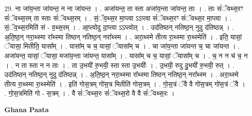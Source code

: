 \documentclass[17pt]{extarticle}
\begin{document}
29. ना जा॑य॒न्ता जा॑यन्त॒ न ना जा॑यन्त । . अजा॑यन्त॒ ता स्ता अजा॑य॒न्ता जा॑यन्त॒ ताः । . ताः सं॑ॅवथ्स॒रꣳ सं॑ॅवथ्स॒रम् ता स्ताः सं॑ॅवथ्स॒रम् । . सं॒ॅव॒थ्स॒र मा॒प्त्वा ऽऽप्त्वा सं॑ॅवथ्स॒रꣳ सं॑ॅवथ्स॒र मा॒प्त्वा । . सं॒ॅव॒थ्स॒रमिति॑ सं - व॒थ्स॒रम् । . आ॒प्त्वोदु दा॒प्त्वा ऽऽप्त्वोत् । . उद॑तिष्ठन् नतिष्ठ॒न् नुदु द॑तिष्ठन्न् । . अ॒ति॒ष्ठ॒न् नरा॒थ्स्मा रा᳚थ्स्मा तिष्ठन् नतिष्ठ॒न् नरा᳚थ्स्म । . अरा॒थ्स्मे तीत्य रा॒थ्स्मा रा॒थ्स्मेति॑ । . इति॒ यासां॒ ॅयासा॒ मितीति॒ यासा᳚म् । . यासा᳚म् च च॒ यासां॒ ॅयासा᳚म् च । . चा जा॑य॒न्ता जा॑यन्त च॒ चा जा॑यन्त । . अजा॑यन्त॒ यासां॒ ॅयासा॒ मजा॑य॒न्ता जा॑यन्त॒ यासा᳚म् । . यासा᳚म् च च॒ यासां॒ ॅयासा᳚म् च । . च॒ न न च॑ च॒ न । . न ता स्ता न न ताः । . ता उ॒भयी॑ रु॒भयी॒ स्ता स्ता उ॒भयीः᳚ । . उ॒भयी॒ रुदु दु॒भयी॑ रु॒भयी॒ रुत् । . उद॑तिष्ठन् नतिष्ठ॒न् नुदु द॑तिष्ठन्न् । . अ॒ति॒ष्ठ॒न् नरा॒थ्स्मा रा᳚थ्स्मा तिष्ठन् नतिष्ठ॒न् नरा᳚थ्स्म । . अरा॒थ्स्मे तीत्य रा॒थ्स्मा रा॒थ्स्मेति॑ । . इति॑ गोस॒त्रम् गो॑स॒त्र मितीति॑ गोस॒त्रम् । . गो॒स॒त्रं ॅवै वै गो॑स॒त्रम् गो॑स॒त्रं ॅवै । . गो॒स॒त्रमिति॑ गो - स॒त्रम् । . वै सं॑ॅवथ्स॒रः सं॑ॅवथ्स॒रो वै वै सं॑ॅवथ्स॒रः । \newline

\textbf{Ghana Paata } \newline
\end{document}
